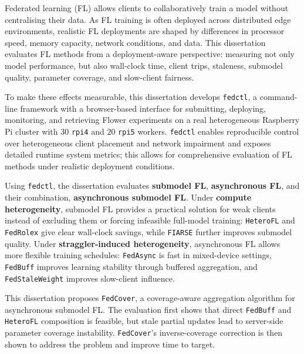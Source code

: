 Federated learning (FL) allows clients to collaboratively train a model without centralising their data. As FL training is often deployed across distributed edge environments, realistic FL deployments are shaped by differences in processor speed, memory capacity, network conditions, and data. This dissertation evaluates FL methods from a deployment-aware perspective: measuring not only model performance, but also wall-clock time, client trips, staleness, submodel quality, parameter coverage, and slow-client fairness.

To make these effects measurable, this dissertation develops \texttt{fedctl}, a command-line framework with a browser-based interface for submitting, deploying, monitoring, and retrieving Flower experiments on a real heterogeneous Raspberry Pi cluster with \(30\) \texttt{rpi4} and \(20\) \texttt{rpi5} workers. \texttt{fedctl} enables reproducible control over heterogeneous client placement and network impairment and exposes detailed runtime system metrics; this allows for comprehensive evaluation of FL methods under realistic deployment conditions.

Using \texttt{fedctl}, the dissertation evaluates \textbf{submodel FL}, \textbf{asynchronous FL}, and their combination, \textbf{asynchronous submodel FL}. Under \textbf{compute heterogeneity}, submodel FL provides a practical solution for weak clients instead of excluding them or forcing infeasible full-model training: \texttt{HeteroFL} and \texttt{FedRolex} give clear wall-clock savings, while \texttt{FIARSE} further improves submodel quality. Under \textbf{straggler-induced heterogeneity}, asynchronous FL allows more flexible training schedules: \texttt{FedAsync} is fast in mixed-device settings, \texttt{FedBuff} improves learning stability through buffered aggregation, and \texttt{FedStaleWeight} improves slow-client influence.

This dissertation proposes \texttt{FedCover}, a coverage-aware aggregation algorithm for asynchronous submodel FL. The evaluation first shows that direct \texttt{FedBuff} and \texttt{HeteroFL} composition is feasible, but stale partial updates lead to server-side parameter coverage instability. \texttt{FedCover}'s inverse-coverage correction is then shown to address the problem and improve time to target. 
